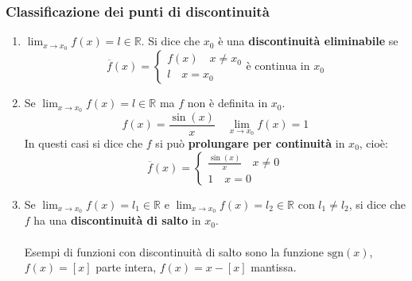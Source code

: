 \documentclass[x11names]{article}
\begin{document}
	\subsubsection{Classificazione dei punti di discontinuità}
	\begin{enumerate}
		\item $\lim_{x \to x_0}f(x) = l \in \mathbb{R}$. Si dice che $x_0$ è una \textbf{discontinuità eliminabile} se
		\[
		\overline{f}(x) = \begin{cases}
			f(x) \quad x \neq x_0 \\
			l \quad x = x_0
		\end{cases} \text{è continua in }  x_0
		\]
		\item Se $\lim_{x \to x_0}f(x) = l \in \mathbb{R}$ ma $f$ non è definita in $x_0$.
		\[
		f(x) = \frac{\sin(x)}{x} \quad \lim_{x \to x_0}f(x) = 1
		\]
		In questi casi si dice che $f$ si può \textbf{prolungare per continuità} in $x_0$, cioè:
		\[
		\overline{f}(x) = \begin{cases}
			\frac{\sin(x)}{x} \quad x \neq 0 \\
			1 \quad x = 0
		\end{cases}
		\]
		\item Se $\lim_{x \to x_0}f(x) = l_1 \in \mathbb{R}$ e $\lim_{x \to x_0}f(x) = l_2 \in \mathbb{R}$ con $l_1 \neq l_2$, si dice che $f$ ha una \textbf{discontinuità di salto} in $x_0$. \\ \\
		Esempi di funzioni con discontinuità di salto sono la funzione $\text{sgn}(x)$, $f(x) = [x]$ parte intera, $f(x) = x -[x]$ mantissa.
	\end{enumerate}
\end{document}

